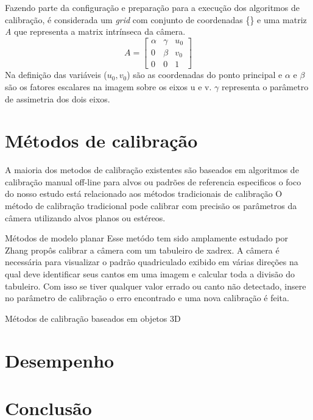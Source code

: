 \documentclass[portuguese]{sbrt}
\begin{document}
Fazendo parte da configuração e preparação para a execução dos algoritmos de calibração, é considerada um \textit{grid} com conjunto de coordenadas \{\} e uma matriz \textit{A} que representa a matrix intrínseca da câmera.
  $$
  A =
  \begin{bmatrix}
   \alpha & \gamma & u_{0}\\ 
   0      & \beta  & v_{0}\\
   0      & 0      & 1    
  \end{bmatrix}
  $$
\newline
  Na definição das variáveis ($u_{0}, v_{0}$) são as coordenadas do ponto principal e $\alpha$ e $\beta$ são os fatores escalares na imagem sobre os eixos u e v. $\gamma$ representa o parâmetro de assimetria dos dois eixos.
\section{Métodos de calibração}
\label{sec:metodos}

A maioria dos metodos de calibração existentes são baseados em algoritmos de
calibração manual off-line para alvos ou padrões de referencia especificos
o foco do nosso estudo está relacionado aos métodos tradicionais de calibração
O método de calibração tradicional pode calibrar com precisão os parâmetros da câmera
utilizando alvos planos ou estéreos. 

Métodos de modelo planar
Esse metódo tem sido amplamente estudado por Zhang propôs calibrar a câmera com um tabuleiro de xadrex.
A câmera é necessária para visualizar o padrão quadriculado exibido em várias direções
na qual deve identificar seus cantos em uma imagem e calcular toda a divisão do tabuleiro. 
Com isso se tiver qualquer valor errado ou canto não detectado, insere no parâmetro de calibração o erro encontrado e uma nova calibração é feita.

Métodos de calibração baseados em objetos 3D


 






\section{Desempenho} 
\label{sec:desempenho}

\section{Conclusão}
\label{sec:conclusao}
 

\end{document}
